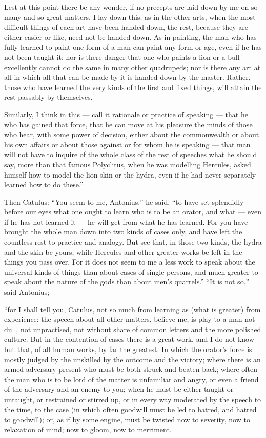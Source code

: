  Lest at this point there be any wonder, if no precepts are laid down by me on so many and so great matters, I lay down this: as in the other arts, when the most difficult things of each art have been handed down, the rest, because they are either easier or like, need not be handed down. As in painting, the man who has fully learned to paint one form of a man can paint any form or age, even if he has not been taught it; nor is there danger that one who paints a lion or a bull excellently cannot do the same in many other quadrupeds; nor is there any art at all in which all that can be made by it is handed down by the master. Rather, those who have learned the very kinds of the first and fixed things, will attain the rest passably by themselves.

 Similarly, I think in this — call it rationale or practice of speaking — that he who has gained that force, that he can move at his pleasure the minds of those who hear, with some power of decision, either about the commonwealth or about his own affairs or about those against or for whom he is speaking — that man will not have to inquire of the whole class of the rest of speeches what he should say, more than that famous Polyclitus, when he was modelling Hercules, asked himself how to model the lion-skin or the hydra, even if he had never separately learned how to do these.''

 Then Catulus: ``You seem to me, Antonius,'' he said, ``to have set splendidly before our eyes what one ought to learn who is to be an orator, and what — even if he has not learned it — he will get from what he has learned. For you have brought the whole man down into two kinds of cases only, and have left the countless rest to practice and analogy. But see that, in those two kinds, the hydra and the skin be yours, while Hercules and other greater works be left in the things you pass over. For it does not seem to me a less work to speak about the universal kinds of things than about cases of single persons, and much greater to speak about the nature of the gods than about men's quarrels.'' ``It is not so,'' said Antonius;

 ``for I shall tell you, Catulus, not so much from learning as (what is greater) from experience: the speech about all other matters, believe me, is play to a man not dull, not unpractised, not without share of common letters and the more polished culture. But in the contention of cases there is a great work, and I do not know but that, of all human works, by far the greatest. In which the orator's force is mostly judged by the unskilled by the outcome and the victory; where there is an armed adversary present who must be both struck and beaten back; where often the man who is to be lord of the matter is unfamiliar and angry, or even a friend of the adversary and an enemy to you; when he must be either taught or untaught, or restrained or stirred up, or in every way moderated by the speech to the time, to the case (in which often goodwill must be led to hatred, and hatred to goodwill); or, as if by some engine, must be twisted now to severity, now to relaxation of mind; now to gloom, now to merriment.

